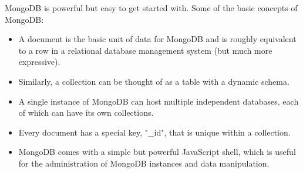 MongoDB is powerful but easy to get started with. Some 
of the basic concepts of MongoDB:
\begin{itemize}
    \item A document is the basic unit of data for MongoDB and is roughly equivalent to a
    row in a relational database management system (but much more expressive).
    \item Similarly, a collection can be thought of as a table with a dynamic schema.
    \item A single instance of MongoDB can host multiple independent databases, each of
    which can have its own collections.
    \item Every document has a special key, "\_id", that is unique within a collection.
    \item MongoDB comes with a simple but powerful JavaScript shell, which is useful for
    the administration of MongoDB instances and data manipulation.
\end{itemize}

